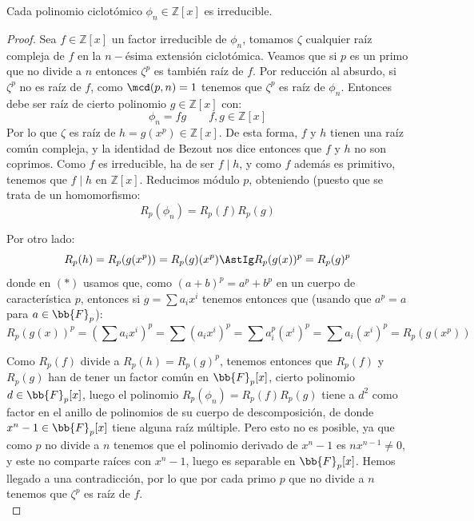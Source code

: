 \begin{teo}
    Cada polinomio ciclotómico $\phi_n\in \mathbb{Z}[x]$ es irreducible.
    \begin{proof}
        Sea $f\in \mathbb{Z}[x]$ un factor irreducible de $\phi_n$, tomamos $\zeta$ cualquier raíz compleja de $f$ en la $n-$ésima extensión ciclotómica. Veamos que si $p$ es un primo que no divide a $n$ entonces $\zeta^p$ es también raíz de $f$. Por reducción al absurdo, si $\zeta^p$ no es raíz de $f$, como $\mcd(p,n)=1$ tenemos que $\zeta^p$ es raíz de $\phi_n$. Entonces debe ser raíz de cierto polinomio $g\in \mathbb{Z}[x]$ con:
        \begin{equation*}
            \phi_n = fg\qquad f,g\in \mathbb{Z}[x]
        \end{equation*}
        Por lo que $\zeta$ es raíz de $h=g(x^p)\in \mathbb{Z}[x]$. De esta forma, $f$ y $h$ tienen una raíz común compleja, y la identidad de Bezout nos dice entonces que $f$ y $h$ no son coprimos. Como $f$ es irreducible, ha de ser $f\mid h$, y como $f$ además es primitivo, tenemos que $f\mid h$ en $\mathbb{Z}[x]$. Reducimos módulo $p$, obteniendo (puesto que se trata de un homomorfismo: 
        \begin{equation*}
            R_p(\phi_n) = R_p(f)R_p(g)
        \end{equation*}

        Por otro lado:
        \begin{equation*}
            R_p(h) = R_p(g(x^p)) = R_p(g)(x^p) \AstIg R_p(g(x))^p = R_p(g)^p
        \end{equation*}
        donde en $(\ast)$ usamos que, como ${(a+b)}^{p} = a^p + b^p$ en un cuerpo de característica $p$, entonces si $g = \sum a_i x^i$ tenemos entonces que (usando que $a^p = a$ para $a \in \bb{F}_p$):
        \begin{equation*}
            R_p(g(x))^p = {\left(\sum a_i x^i\right)}^{p} = \sum {(a_ix^i)}^{p} = \sum a_i^p {(x^i)}^{p} = \sum a_i {(x^i)}^{p} = R_p(g(x^p))
        \end{equation*}

        Como $R_p(f)$ divide a $R_p(h) = R_p(g)^p$, tenemos entonces que $R_p(f)$ y $R_p(g)$ han de tener un factor común en $\bb{F}_p[x]$, cierto polinomio $d\in \bb{F}_p[x]$, luego el polinomio $R_p(\phi_n) = R_p(f)R_p(g)$ tiene a $d^2$ como factor en el anillo de polinomios de su cuerpo de descomposición, de donde $x^n-1\in \bb{F}_p[x]$ tiene alguna raíz múltiple. Pero esto no es posible, ya que como $p$ no divide a $n$ tenemos que el polinomio derivado de $x^n-1$ es $nx^{n-1} \neq 0$, y este no comparte raíces con $x^n-1$, luego es separable en $\bb{F}_p[x]$. Hemos llegado a una contradicción, por lo que por cada primo $p$ que no divide a $n$ tenemos que $\zeta^p$ es raíz de $f$.\\


\end{proof}
\end{teo}

